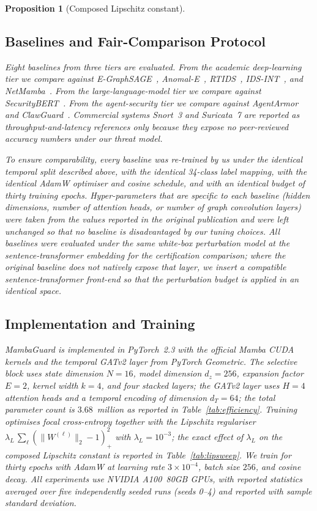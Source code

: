\documentclass{ieeeaccess}
\newtheorem{proposition}[theorem]{Proposition}
\begin{document}
\begin{proposition}[Composed Lipschitz constant]
\subsection{Baselines and Fair-Comparison Protocol}
\label{sec:baselines}
Eight baselines from three tiers are evaluated. From the academic deep-learning tier we compare against E-GraphSAGE~\cite{Lo2022EGraphSAGE}, Anomal-E~\cite{Caville2022AnomalE}, RTIDS~\cite{Wu2022RTIDS}, IDS-INT~\cite{Ullah2024IDSINT}, and NetMamba~\cite{Wang2025NetMamba}. From the large-language-model tier we compare against SecurityBERT~\cite{Ferrag2024SecurityBERT}. From the agent-security tier we compare against AgentArmor~\cite{Wang2025AgentArmor} and ClawGuard~\cite{Zhao2026ClawGuard}. Commercial systems Snort~3 and Suricata~7 are reported as throughput-and-latency references only because they expose no peer-reviewed accuracy numbers under our threat model.

To ensure comparability, every baseline was re-trained by us under the identical temporal split described above, with the identical 34-class label mapping, with the identical AdamW optimiser and cosine schedule, and with an identical budget of thirty training epochs. Hyper-parameters that are specific to each baseline (hidden dimensions, number of attention heads, or number of graph convolution layers) were taken from the values reported in the original publication and were left unchanged so that no baseline is disadvantaged by our tuning choices. All baselines were evaluated under the same white-box perturbation model at the sentence-transformer embedding for the certification comparison; where the original baseline does not natively expose that layer, we insert a compatible sentence-transformer front-end so that the perturbation budget is applied in an identical space.

\subsection{Implementation and Training}
\label{sec:impl}
MambaGuard is implemented in PyTorch~2.3 with the official Mamba CUDA kernels and the temporal GATv2 layer from PyTorch Geometric. The selective block uses state dimension $N=16$, model dimension $d_{z}=256$, expansion factor $E=2$, kernel width $k=4$, and four stacked layers; the GATv2 layer uses $H=4$ attention heads and a temporal encoding of dimension $d_{T}=64$; the total parameter count is $3.68$~million as reported in Table~\ref{tab:efficiency}. Training optimises focal cross-entropy together with the Lipschitz regulariser $\lambda_{L}\,\sum_{\ell}(\|W^{(\ell)}\|_{2}-1)_{+}^{2}$ with $\lambda_{L}=10^{-3}$; the exact effect of $\lambda_{L}$ on the composed Lipschitz constant is reported in Table~\ref{tab:lipsweep}. We train for thirty epochs with AdamW at learning rate $3\times10^{-4}$, batch size $256$, and cosine decay. All experiments use NVIDIA A100~80GB GPUs, with reported statistics averaged over five independently seeded runs (seeds 0--4) and reported with sample standard deviation.


\end{proposition}
\end{document}
